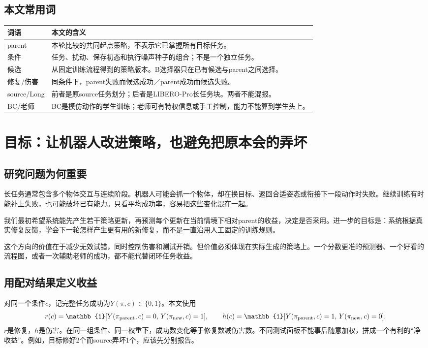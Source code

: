 \documentclass[UTF8,a4paper,fontset=none,zihao=-4]{ctexart}
\begin{document}
\subsection*{本文常用词}
\noindent\begin{tabularx}{\textwidth}{p{23mm}Y}
\toprule
词语 & 本文的含义\\\midrule
parent & 本轮比较的共同起点策略，不表示它已掌握所有目标任务。\\
条件 & 任务、扰动、保存初态和执行噪声种子的组合；不是一个独立任务。\\
候选 & 从固定训练流程得到的策略版本。B选择器只在已有候选与parent之间选择。\\
修复/伤害 & 同条件下，parent失败而候选成功／parent成功而候选失败。\\
source/Long & 前者是原source任务划分；后者是LIBERO-Pro长任务块。两者不能混报。\\
BC/老师 & BC是模仿动作的学生训练；老师可有特权信息或手工控制，能力不能算到学生头上。\\
\bottomrule
\end{tabularx}
\newpage
\section{目标：让机器人改进策略，也避免把原本会的弄坏}
\subsection{研究问题为何重要}
长任务通常包含多个物体交互与连续阶段。机器人可能会抓一个物体，却在换目标、返回合适姿态或衔接下一段动作时失败。继续训练有时能补上失败，也可能破坏已有能力。只看平均成功率，容易把这些变化混在一起。

我们最初希望系统能先产生若干策略更新，再预测每个更新在当前情境下相对parent的收益，决定是否采用。进一步的目标是：系统根据真实修复反馈，学会下一轮怎样产生更有用的新修复，而不是一直沿用人工固定的训练规则。

这个方向的价值在于减少无效试错，同时控制伤害和测试开销。但价值必须体现在实际生成的策略上。一个分数更准的预测器、一个好看的流程图，或者一次辅助老师的成功，都不能代替闭环任务收益。
\subsection{用配对结果定义收益}
对同一个条件$c$，记完整任务成功为$Y(\pi,c)\in\{0,1\}$。本文使用
\[
 r(c)=\mathbb{1}[Y(\pi_{\rm parent},c)=0,\,Y(\pi_{\rm new},c)=1],\qquad
 h(c)=\mathbb{1}[Y(\pi_{\rm parent},c)=1,\,Y(\pi_{\rm new},c)=0].
\]
$r$是修复，$h$是伤害。在同一组条件、同一权重下，成功数变化等于修复数减伤害数。不同测试面板不能事后随意加权，拼成一个有利的“净收益”。例如，目标修好2个而source弄坏1个，应该先分别报告。
\end{document}
